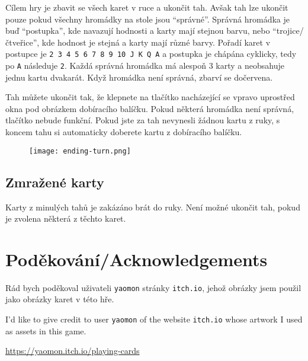 \documentclass{article}
\begin{document}
Cílem hry je zbavit se všech karet v ruce a ukončit tah. Avšak tah lze ukončit
pouze pokud všechny hromádky na stole jsou \enquote{správné}. Správná hromádka
je buď \enquote{postupka}, kde navazují hodnosti a karty mají stejnou barvu,
nebo \enquote{trojice/čtveřice}, kde hodnost je stejná a karty mají různé
barvy. Pořadí karet v postupce je \texttt{2 3 4 5 6 7 8 9 10 J K Q A} a
postupka je chápána cyklicky, tedy po \texttt{A} následuje \texttt{2}. Každá
správná hromádka má alespoň 3 karty a neobsahuje jednu kartu dvakarát. Když
hromádka není správná, zbarví se dočervena.

Tah můžete ukončit tak, že klepnete na tlačítko nacházející se vpravo uprostřed
okna pod obrázkem dobíracího balíčku. Pokud některá hromádka není správná,
tlačítko nebude funkční. Pokud jste za tah nevynesli žádnou kartu z ruky,
s koncem tahu si automaticky doberete kartu z dobíracího balíčku.

\begin{figure}[H]
	\begin{center}
		\texttt{[image: ending-turn.png]}
	\end{center}
\end{figure}

\subsection*{Zmražené karty}

Karty z minulých tahů je zakázáno brát do ruky. Není možné ukončit tah, pokud
je zvolena některá z těchto karet.

\section*{Poděkování/Acknowledgements}

Rád bych poděkoval uživateli \texttt{yaomon} stránky \texttt{itch.io}, jehož
obrázky jsem použil jako obrázky karet v této hře.

I'd like to give credit to user \texttt{yaomon} of the website \texttt{itch.io}
whose artwork I used as assets in this game.

\url{https://yaomon.itch.io/playing-cards}
\end{document}
